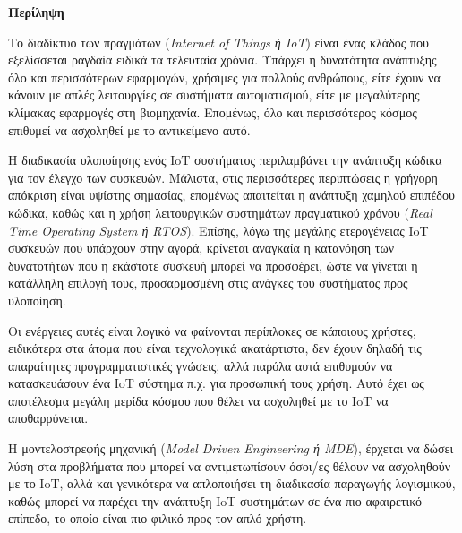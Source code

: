 \begin{center}
  \centering

  \vspace{0.5cm}
  \centering
  \textbf{\Large{Περίληψη}}

  \vspace{1cm}

\end{center}

Το διαδίκτυο των πραγμάτων (\textit{Internet of Things ή IoT}) είναι ένας κλάδος που εξελίσσεται ραγδαία ειδικά τα τελευταία χρόνια. Υπάρχει η δυνατότητα ανάπτυξης όλο και περισσότερων εφαρμογών, χρήσιμες για πολλούς ανθρώπους, είτε έχουν να κάνουν με απλές λειτουργίες σε συστήματα αυτοματισμού, είτε με μεγαλύτερης κλίμακας εφαρμογές στη βιομηχανία. Επομένως, όλο και περισσότερος κόσμος επιθυμεί να ασχοληθεί με το αντικείμενο αυτό.

Η διαδικασία υλοποίησης ενός IoT συστήματος περιλαμβάνει την ανάπτυξη κώδικα για τον έλεγχο των συσκευών. Μάλιστα, στις περισσότερες περιπτώσεις η γρήγορη απόκριση είναι υψίστης σημασίας, επομένως απαιτείται η ανάπτυξη χαμηλού επιπέδου κώδικα, καθώς και η χρήση λειτουργικών συστημάτων πραγματικού χρόνου (\textit{Real Time Operating System ή RTOS}). Επίσης, λόγω της μεγάλης ετερογένειας IoT συσκευών που υπάρχουν στην αγορά, κρίνεται αναγκαία η κατανόηση των δυνατοτήτων που η εκάστοτε συσκευή μπορεί να προσφέρει, ώστε να γίνεται η κατάλληλη επιλογή τους, προσαρμοσμένη στις ανάγκες του συστήματος προς υλοποίηση.

Οι ενέργειες αυτές είναι λογικό να φαίνονται περίπλοκες σε κάποιους χρήστες, ειδικότερα στα άτομα που είναι τεχνολογικά ακατάρτιστα, δεν έχουν δηλαδή τις απαραίτητες προγραμματιστικές γνώσεις, αλλά παρόλα αυτά επιθυμούν να κατασκευάσουν ένα IoT σύστημα π.χ. για προσωπική τους χρήση. Αυτό έχει ως αποτέλεσμα μεγάλη μερίδα κόσμου που θέλει να ασχοληθεί με το IoT να αποθαρρύνεται.

Η μοντελοστρεφής μηχανική (\textit{Model Driven Engineering ή MDE}), έρχεται να δώσει λύση στα προβλήματα που μπορεί να αντιμετωπίσουν όσοι/ες θέλουν να ασχοληθούν με το IoT, αλλά και γενικότερα να απλοποιήσει τη διαδικασία παραγωγής λογισμικού, καθώς μπορεί να παρέχει την ανάπτυξη IoT συστημάτων σε ένα πιο αφαιρετικό επίπεδο, το οποίο είναι πιο φιλικό προς τον απλό χρήστη.

